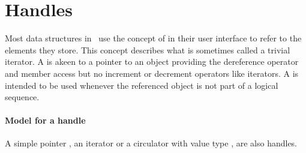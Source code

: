 
\section{Handles} 


Most data structures in \cgal\ use the concept of  in their user
interface to refer to the elements they store.  This concept describes what is
sometimes called a trivial iterator.  A  is akeen to a pointer to
an object providing the dereference operator  and member
access  but no increment or decrement operators like
iterators.  A  is intended to be used whenever the referenced
object is not part of a logical sequence.
 
\paragraph{Model for a handle}
A simple pointer , an iterator or a circulator with value type
, are also handles.
